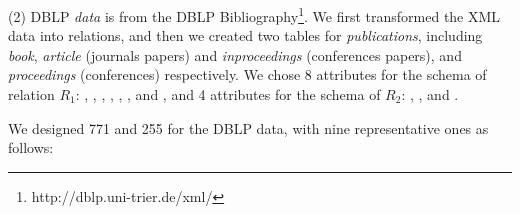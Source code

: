 \begin{footnotesize}
\end{footnotesize}

(2) DBLP \textit{data} is from the DBLP Bibliography\footnote{http://dblp.uni-trier.de/xml/}. We first transformed the XML data into relations, and then we created two tables for \textit{publications}, including \textit{book}, \textit{article} (journals papers) and \textit{inproceedings} (conferences papers), and \textit{proceedings} (conferences) respectively. We chose 8 attributes for the schema of relation $R_1$: , , , , , ,  and , and 4 attributes for the schema of $R_2$: , ,  and .


We designed 771 \pCFDs and 255 \pCINDs for the DBLP data, with nine representative ones as follows:\\

